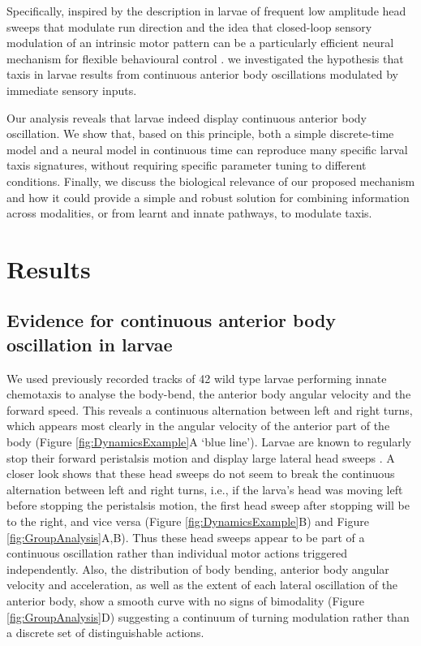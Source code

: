 \documentclass[11pt,a4paper]{article}
\begin{document}
Specifically, inspired by the description in larvae of frequent low amplitude head sweeps that modulate run direction \citep{gomez2014multilevel} and the idea that closed-loop sensory modulation of an intrinsic motor pattern can be a particularly efficient neural mechanism for flexible behavioural control \citep{izquierdo2010evolution,kanzaki1996behavioral,levi2005role,willis1997active}. 
 we investigated the hypothesis that taxis in larvae results from continuous anterior body oscillations modulated by immediate sensory inputs. 

Our analysis reveals that larvae indeed display continuous anterior body oscillation. We show that, based on this principle, both a simple discrete-time model and a neural model in continuous time can reproduce many specific larval taxis signatures, without requiring specific parameter tuning to different conditions. Finally, we discuss the biological relevance of our proposed mechanism and how it could provide a simple and robust solution for combining information across modalities, or from learnt and innate pathways, to modulate taxis.

\section{Results}
\subsection{Evidence for continuous anterior body oscillation in larvae}
 We used previously recorded tracks of 42 wild type larvae performing innate chemotaxis \citep{gomez2012active} to analyse the body-bend, the anterior body angular velocity and the forward speed. This reveals a continuous alternation between left and right turns, which appears most clearly in the angular velocity of the anterior part of the body (Figure \ref{fig:DynamicsExample}A ‘blue line’). Larvae are known to regularly stop their forward peristalsis motion and display large lateral head sweeps \citep{gomez2011active}. A closer look shows that these head sweeps do not seem to break the continuous alternation between left and right turns, i.e., if the larva’s head was moving left before stopping the peristalsis motion, the first head sweep after stopping will be to the right, and vice versa (Figure \ref{fig:DynamicsExample}B) and Figure \ref{fig:GroupAnalysis}A,B). Thus these head sweeps appear to be part of a continuous oscillation rather than individual motor actions triggered independently. Also, the distribution of body bending, anterior body angular velocity and acceleration, as well as the extent of each lateral oscillation of the anterior body, show a smooth curve with no signs of bimodality (Figure \ref{fig:GroupAnalysis}D) suggesting a continuum of turning modulation rather than a discrete set of distinguishable actions. 
\end{document}
